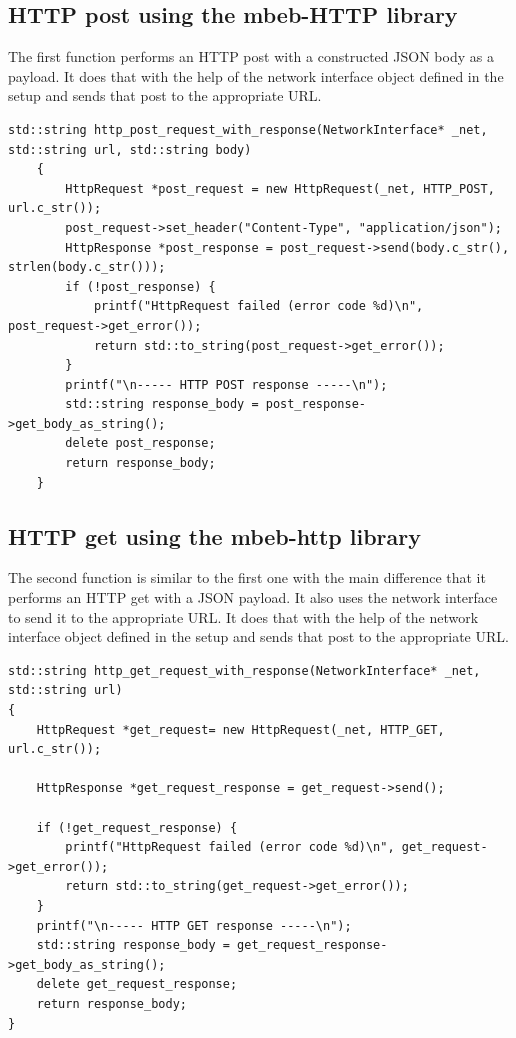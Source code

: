 \subsection{HTTP post using the mbeb-HTTP library}
The first function performs an HTTP post with a constructed JSON body as a payload.
It does that with the help of the network interface object defined in the setup and sends that post to the appropriate URL.
\begin{lstlisting}[style=CStyle]
    std::string http_post_request_with_response(NetworkInterface* _net, std::string url, std::string body)
    {
        HttpRequest *post_request = new HttpRequest(_net, HTTP_POST, url.c_str());
        post_request->set_header("Content-Type", "application/json");
        HttpResponse *post_response = post_request->send(body.c_str(), strlen(body.c_str()));
        if (!post_response) {
            printf("HttpRequest failed (error code %d)\n", post_request->get_error());
            return std::to_string(post_request->get_error());
        }
        printf("\n----- HTTP POST response -----\n");
        std::string response_body = post_response->get_body_as_string();
        delete post_response;
        return response_body;
    }
\end{lstlisting}
\subsection{HTTP get using the mbeb-http library}
The second function is similar to the first one with the main difference that it performs an HTTP get with a JSON payload.
It also uses the network interface to send it to the appropriate URL.
It does that with the help of the network interface object defined in the setup and sends that post to the appropriate URL.
\begin{lstlisting}[style=CStyle]
std::string http_get_request_with_response(NetworkInterface* _net, std::string url)
{
    HttpRequest *get_request= new HttpRequest(_net, HTTP_GET, url.c_str());

    HttpResponse *get_request_response = get_request->send();

    if (!get_request_response) {
        printf("HttpRequest failed (error code %d)\n", get_request->get_error());
        return std::to_string(get_request->get_error());
    }
    printf("\n----- HTTP GET response -----\n");
    std::string response_body = get_request_response->get_body_as_string();
    delete get_request_response;
    return response_body;
}
\end{lstlisting}
